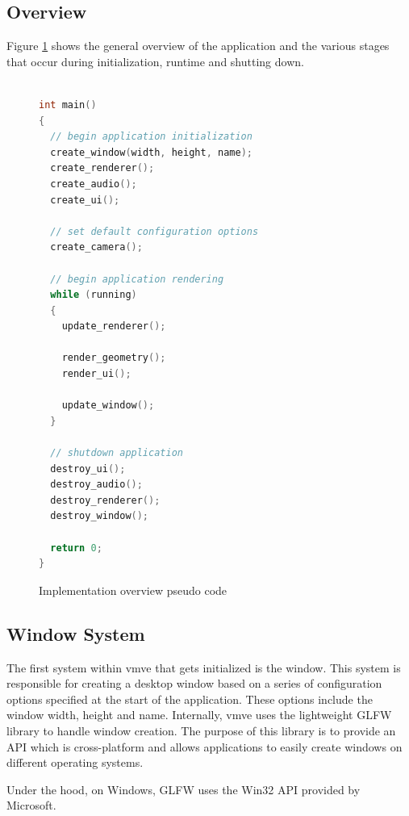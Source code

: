 \documentclass[11pt]{article}
\begin{document}


\subsection{Overview}
Figure \ref{fig:overview_pseudo_code} shows the general overview of the application and the various 
stages that occur during initialization, runtime and shutting down.


\begin{figure}[H]
\centering
\begin{lstlisting}[language=C++]

int main()
{
  // begin application initialization
  create_window(width, height, name);
  create_renderer();
  create_audio();
  create_ui();

  // set default configuration options
  create_camera();
  
  // begin application rendering
  while (running)
  {
    update_renderer();

    render_geometry();
    render_ui();

    update_window();
  }

  // shutdown application
  destroy_ui();
  destroy_audio();
  destroy_renderer();
  destroy_window();

  return 0;
}
\end{lstlisting}
\caption{Implementation overview pseudo code}
\label{fig:overview_pseudo_code}
\end{figure}

  

\subsection{Window System}
The first system within \gls*{vmve} that gets initialized is the window. This system is
responsible for creating a desktop window based on a series of configuration
options specified at the start of the application. These options include the
window width, height and name. Internally, \gls*{vmve} uses the lightweight GLFW
library to handle window creation. The purpose of this library is to provide an
API which is cross-platform and allows applications to easily create windows on
different operating systems. 

Under the hood, on Windows, GLFW uses the Win32 API provided by Microsoft.
\end{document}

